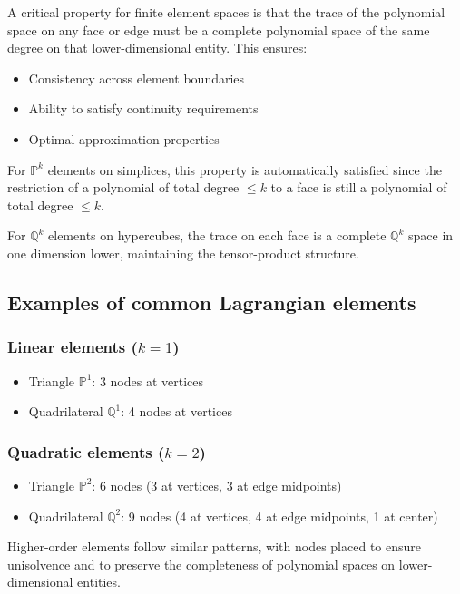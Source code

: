 A critical property for finite element spaces is that the trace of the polynomial space on any face or edge must be a complete polynomial space of the same degree on that lower-dimensional entity. This ensures:

\begin{itemize}
\item Consistency across element boundaries
\item Ability to satisfy continuity requirements
\item Optimal approximation properties
\end{itemize}

For $\mathbb{P}^k$ elements on simplices, this property is automatically satisfied since the restriction of a polynomial of total degree $\leq k$ to a face is still a polynomial of total degree $\leq k$.

For $\mathbb{Q}^k$ elements on hypercubes, the trace on each face is a complete $\mathbb{Q}^k$ space in one dimension lower, maintaining the tensor-product structure.

\subsection{Examples of common Lagrangian elements}

\subsubsection{Linear elements ($k=1$)}

\begin{itemize}
\item Triangle $\mathbb{P}^1$: 3 nodes at vertices
\item Quadrilateral $\mathbb{Q}^1$: 4 nodes at vertices
\end{itemize}

\subsubsection{Quadratic elements ($k=2$)}

\begin{itemize}
\item Triangle $\mathbb{P}^2$: 6 nodes (3 at vertices, 3 at edge midpoints)
\item Quadrilateral $\mathbb{Q}^2$: 9 nodes (4 at vertices, 4 at edge midpoints, 1 at center)
\end{itemize}

Higher-order elements follow similar patterns, with nodes placed to ensure unisolvence and to preserve the completeness of polynomial spaces on lower-dimensional entities.


